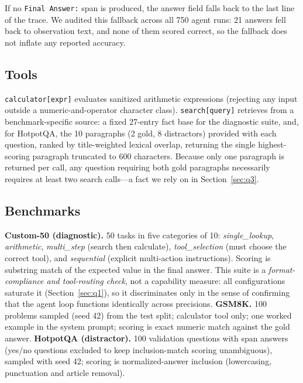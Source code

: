 \documentclass{article}
\begin{document}
If no \texttt{Final Answer:} span is produced, the answer field falls
back to the last line of the trace. We audited this fallback across all
750 agent runs: 21 answers fell back to observation text, and none of
them scored correct, so the fallback does not inflate any reported
accuracy.

\subsection{Tools}
\texttt{calculator[expr]} evaluates sanitized arithmetic expressions
(rejecting any input outside a numeric-and-operator character class).
\texttt{search[query]} retrieves from a benchmark-specific source: a
fixed 27-entry fact base for the diagnostic suite, and, for HotpotQA, the
10 paragraphs (2 gold, 8 distractors) provided with each question, ranked by
title-weighted lexical overlap, returning the single highest-scoring
paragraph truncated to 600 characters. Because only one paragraph is
returned per call, any question requiring both gold paragraphs
necessarily requires at least two search calls---a fact we rely on in
Section~\ref{sec:q3}.

\subsection{Benchmarks}
\label{sec:benchmarks}
\textbf{Custom-50 (diagnostic).} 50 tasks in five categories of 10:
\emph{single\_lookup}, \emph{arithmetic}, \emph{multi\_step} (search then
calculate), \emph{tool\_selection} (must choose the correct tool), and
\emph{sequential} (explicit multi-action instructions). Scoring is
substring match of the expected value in the final answer. This suite is
a \emph{format-compliance and tool-routing check}, not a capability
measure: all configurations saturate it (Section~\ref{sec:q1}), so it
discriminates only in the sense of confirming that the agent loop
functions identically across precisions.
\textbf{GSM8K.} 100 problems sampled (seed 42) from the test split;
calculator tool only; one worked example in the system prompt; scoring is
exact numeric match against the gold answer.
\textbf{HotpotQA (distractor).} 100 validation questions with span
answers (yes/no questions excluded to keep inclusion-match scoring
unambiguous), sampled with seed 42; scoring is normalized-answer
inclusion (lowercasing, punctuation and article removal).
\end{document}
